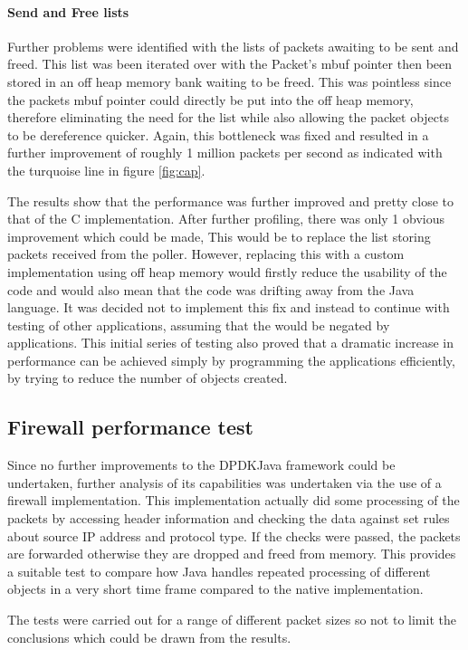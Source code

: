 \documentclass[final_report.tex]{subfiles}
\begin{document}
\paragraph*{Send and Free lists} Further problems were identified with the lists of packets awaiting to be sent and freed. This list was been iterated over with the Packet's mbuf pointer then been stored in an off heap memory bank waiting to be freed. This was pointless since the packets mbuf pointer could directly be put into the off heap memory, therefore eliminating the need for the list while also allowing the packet objects to be dereference quicker. Again, this bottleneck was fixed and resulted in a further improvement of roughly 1 million packets per second as indicated with the turquoise line in figure \ref{fig:cap}.

The results show that the performance was further improved and pretty close to that of the C implementation. After further profiling, there was only 1 obvious improvement which could be made, This would be to replace the list storing packets received from the poller. However, replacing this with a custom implementation using off heap memory would firstly reduce the usability of the code and would also mean that the code was drifting away from the Java language. It was decided not to implement this fix and instead to continue with testing of other applications, assuming that the would be negated by applications. This initial series of testing also proved that a dramatic increase in performance can be achieved simply by programming the applications efficiently, by trying to reduce the number of objects created.

\subsection{Firewall performance test}
Since no further improvements to the DPDKJava framework could be undertaken, further analysis of its capabilities was undertaken via the use of a firewall implementation. This implementation actually did some processing of the packets by accessing header information and checking the data against set rules about source IP address and protocol type. If the checks were passed, the packets are forwarded otherwise they are dropped and freed from memory. This provides a suitable test to compare how Java handles repeated processing of different objects in a very short time frame compared to the native implementation.

The tests were carried out for a range of different packet sizes so not to limit the conclusions which could be drawn from the results.
\end{document}

